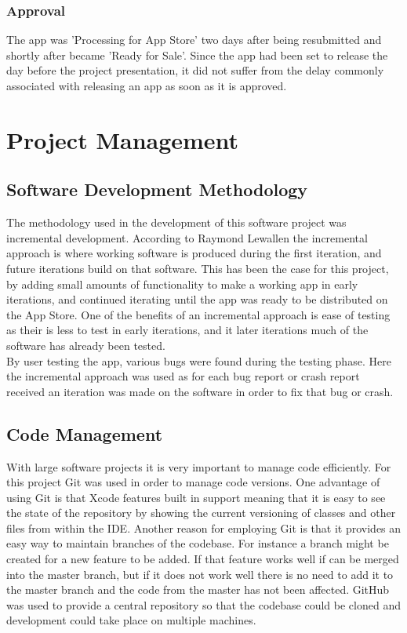 \documentclass[12pt]{report}
\begin{document}
\subsection{Approval}

The app was 'Processing for App Store' two days after being resubmitted and shortly after became 'Ready for Sale'. Since the app had been set to release the day before the project presentation, it did not suffer from the delay commonly associated with releasing an app as soon as it is approved.

\chapter{Project Management}

\section{Software Development Methodology}

The methodology used in the development of this software project was incremental development. According to Raymond Lewallen \cite{raylewallen} the incremental approach is where working software is produced during the first iteration, and future iterations build on that software. This has been the case for this project, by adding small amounts of functionality to make a working app in early iterations, and continued iterating until the app was ready to be distributed on the App Store. One of the benefits of an incremental approach is ease of testing as their is less to test in early iterations, and it later iterations much of the software has already been tested.\\

By user testing the app, various bugs were found during the testing phase. Here the incremental approach was used as for each bug report or crash report received an iteration was made on the software in order to fix that bug or crash.

\section{Code Management}

With large software projects it is very important to manage code efficiently. For this project Git was used in order to manage code versions. One advantage of using Git is that Xcode features built in support meaning that it is easy to see the state of the repository by showing the current versioning of classes and other files from within the IDE. Another reason for employing Git is that it provides an easy way to maintain branches of the codebase. For instance a branch might be created for a new feature to be added. If that feature works well if can be merged into the master branch, but if it does not work well there is no need to add it to the master branch and the code from the master has not been affected. GitHub \cite{github} was used to provide a central repository so that the codebase could be cloned and development could take place on multiple machines.\\ 
\end{document}
